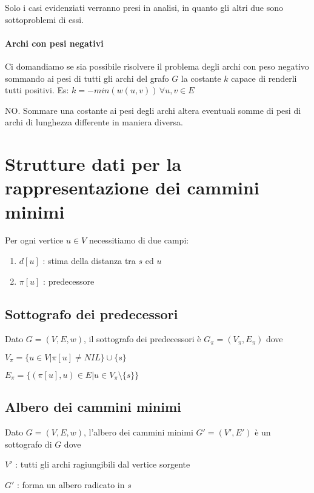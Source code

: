{Solo i casi evidenziati verranno presi in analisi, in quanto gli altri due sono sottoproblemi di essi.}

\paragraph{Archi con pesi negativi}

{Ci domandiamo se sia possibile risolvere il problema degli archi con peso negativo sommando ai pesi di tutti gli archi del grafo $G$ la costante $k$ capace di renderli tutti positivi. Es: $k=-min(w(u,v))\,\forall u,v \in E$}

{NO. Sommare una costante ai pesi degli archi altera eventuali somme di pesi di archi di lunghezza differente in maniera diversa.}

\section{Strutture dati per la rappresentazione dei cammini minimi}

{Per ogni vertice $u \in V$ necessitiamo di due campi:}

\begin{enumerate}
\tightlist
\item
$d[u]$ : stima della distanza tra $s$ ed $u$
\item
$\pi[u]$ : predecessore
\end{enumerate}

\subsection{Sottografo dei predecessori}

{Dato $G=(V,E,w)$, il sottografo dei predecessori è $G_\pi=(V_\pi,E_\pi)$ dove}

$V_\pi=\{u \in V | \pi[u] \neq NIL\} \cup \{s\}$

$E_\pi=\{(\pi[u],u) \in E | u \in V_{\pi} \setminus \{s\}\}$

\subsection{Albero dei cammini minimi}

{Dato $G=(V,E,w)$, l'albero dei cammini minimi $G'=(V',E')$ è un sottografo di $G$ dove}

{$V'$ : tutti gli archi ragiungibili dal vertice sorgente}

{$G'$ : forma un albero radicato in $s$}

